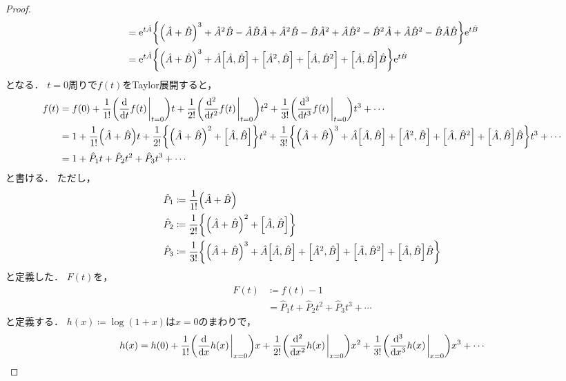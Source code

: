 \documentclass{report}
\begin{document}
\begin{proof}
\begin{align}
        &= \mathrm{e}^{t\hat{A}}\qty{\qty(\hat{A} + \hat{B})^3 + \hat{A}^2\hat{B} - \hat{A}\hat{B}\hat{A} + \hat{A}^2\hat{B} - \hat{B}\hat{A}^2 + \hat{A}\hat{B}^2 - \hat{B}^2\hat{A} + \hat{A}\hat{B}^2 - \hat{B}\hat{A}\hat{B}}\mathrm{e}^{t\hat{B}} \\ 
        &= \mathrm{e}^{t\hat{A}}\qty{\qty(\hat{A} + \hat{B})^3 + \hat{A}\qty[\hat{A}, \hat{B}] + \qty[\hat{A}^2, \hat{B}] + \qty[\hat{A}, \hat{B}^2] + \qty[\hat{A}, \hat{B}]\hat{B}}\mathrm{e}^{t\hat{B}} 
      \end{align}
      となる．
      $t = 0$周りで$f(t)$をTaylor展開すると，
      \begin{align}
        f(t) &= f(0) + \frac{1}{1!}\qty(\dv{t}f(t)\eval_{t = 0})t + \frac{1}{2!}\qty(\dv[2]{t}f(t)\eval_{t = 0})t^2 + \frac{1}{3!}\qty(\dv[3]{t}f(t)\eval_{t = 0})t^3 + \cdots \\ 
        &= 1 + \frac{1}{1!}\qty(\hat{A} + \hat{B})t + \frac{1}{2!}\qty{\qty(\hat{A} + \hat{B})^2 + \qty[\hat{A}, \hat{B}]}t^2 + \frac{1}{3!}\qty{\qty(\hat{A} + \hat{B})^3 + \hat{A}\qty[\hat{A}, \hat{B}] + \qty[\hat{A}^2, \hat{B}] + \qty[\hat{A}, \hat{B}^2] + \qty[\hat{A}, \hat{B}]\hat{B}}t^3 + \cdots \\ 
        &= 1 + \hat{P}_1t + \hat{P}_2t^2 + \hat{P}_3t^3 + \cdots \\ 
      \end{align}
      と書ける．
      ただし，
      \begin{align}
        \hat{P}_1 &\coloneqq \frac{1}{1!}\qty(\hat{A} + \hat{B}) \\ 
        \hat{P}_2 &\coloneqq \frac{1}{2!}\qty{\qty(\hat{A} + \hat{B})^2 + \qty[\hat{A}, \hat{B}]} \\ 
        \hat{P}_3 &\coloneqq \frac{1}{3!}\qty{\qty(\hat{A} + \hat{B})^3 + \hat{A}\qty[\hat{A}, \hat{B}] + \qty[\hat{A}^2, \hat{B}] + \qty[\hat{A}, \hat{B}^2] + \qty[\hat{A}, \hat{B}]\hat{B}}
      \end{align}
      と定義した．
      $F(t)$を，
      \begin{align}
        F(t) &\coloneqq f(t) - 1 \\ 
        &= \hat{P}_1t + \hat{P}_2t^2 + \hat{P}_3t^3 + \cdots
      \end{align}
      と定義する．
      $h(x) \coloneqq \log (1 + x)$は$x = 0$のまわりで，
      \begin{align}
        h(x) &= h(0) + \frac{1}{1!}\qty(\dv{x}h(x)\eval_{x = 0})x + \frac{1}{2!}\qty(\dv[2]{x}h(x)\eval_{x = 0})x^2 + \frac{1}{3!}\qty(\dv[3]{x}h(x)\eval_{x = 0})x^3 + \cdots \\ 

\end{align}
\end{proof}
\end{document}

